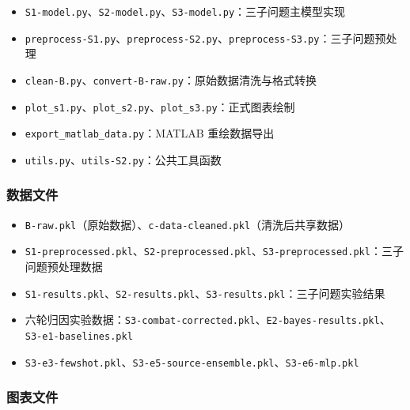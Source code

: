 \begin{itemize}\setlength{\itemsep}{0pt}
  \item \texttt{S1-model.py}、\texttt{S2-model.py}、\texttt{S3-model.py}：三子问题主模型实现
  \item \texttt{preprocess-S1.py}、\texttt{preprocess-S2.py}、\texttt{preprocess-S3.py}：三子问题预处理
  \item \texttt{clean-B.py}、\texttt{convert-B-raw.py}：原始数据清洗与格式转换
  \item \texttt{plot\_s1.py}、\texttt{plot\_s2.py}、\texttt{plot\_s3.py}：正式图表绘制
  \item \texttt{export\_matlab\_data.py}：MATLAB 重绘数据导出
  \item \texttt{utils.py}、\texttt{utils-S2.py}：公共工具函数
\end{itemize}

\subsubsection*{数据文件}

\begin{itemize}\setlength{\itemsep}{0pt}\raggedright
  \item \texttt{B-raw.pkl}（原始数据）、\texttt{c-data-cleaned.pkl}（清洗后共享数据）
  \item \texttt{S1-preprocessed.pkl}、\texttt{S2-preprocessed.pkl}、\texttt{S3-preprocessed.pkl}：三子问题预处理数据
  \item \texttt{S1-results.pkl}、\texttt{S2-results.pkl}、\texttt{S3-results.pkl}：三子问题实验结果
  \item 六轮归因实验数据：\texttt{S3-combat-corrected.pkl}、\texttt{E2-bayes-results.pkl}、\texttt{S3-e1-baselines.pkl}
  \item \hspace{2em}\texttt{S3-e3-fewshot.pkl}、\texttt{S3-e5-source-ensemble.pkl}、\texttt{S3-e6-mlp.pkl}
\end{itemize}

\subsubsection*{图表文件}


